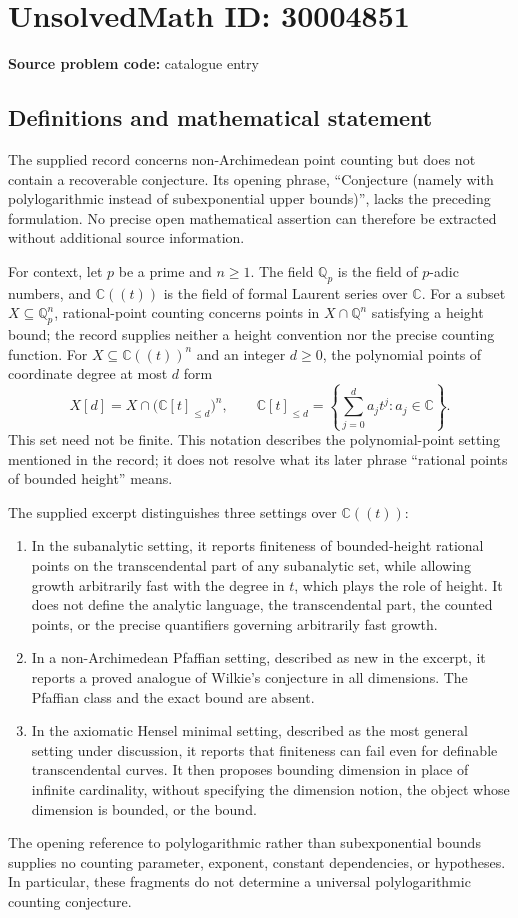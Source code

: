 \documentclass[11pt]{article}
\newcommand{\Q}{\mathbb{Q}}
\newcommand{\C}{\mathbb{C}}
\begin{document}
\section*{UnsolvedMath ID: 30004851}
\textbf{Source problem code:} catalogue entry
\subsection{Definitions and mathematical statement}
The supplied record concerns non-Archimedean point counting but does not contain a recoverable conjecture. Its opening phrase, ``Conjecture (namely with polylogarithmic instead of subexponential upper bounds)'', lacks the preceding formulation. No precise open mathematical assertion can therefore be extracted without additional source information.

For context, let \(p\) be a prime and \(n\geq 1\). The field \(\Q_p\) is the field of \(p\)-adic numbers, and \(\C((t))\) is the field of formal Laurent series over \(\C\). For a subset \(X\subseteq\Q_p^n\), rational-point counting concerns points in \(X\cap\Q^n\) satisfying a height bound; the record supplies neither a height convention nor the precise counting function. For \(X\subseteq\C((t))^n\) and an integer \(d\geq 0\), the polynomial points of coordinate degree at most \(d\) form
\[
X[d]=X\cap\bigl(\C[t]_{\leq d}\bigr)^n,
\qquad
\C[t]_{\leq d}=\left\{\sum_{j=0}^{d}a_jt^j:a_j\in\C\right\}.
\]
This set need not be finite. This notation describes the polynomial-point setting mentioned in the record; it does not resolve what its later phrase ``rational points of bounded height'' means.

The supplied excerpt distinguishes three settings over \(\C((t))\):
\begin{enumerate}
\item In the subanalytic setting, it reports finiteness of bounded-height rational points on the transcendental part of any subanalytic set, while allowing growth arbitrarily fast with the degree in \(t\), which plays the role of height. It does not define the analytic language, the transcendental part, the counted points, or the precise quantifiers governing arbitrarily fast growth.
\item In a non-Archimedean Pfaffian setting, described as new in the excerpt, it reports a proved analogue of Wilkie's conjecture in all dimensions. The Pfaffian class and the exact bound are absent.
\item In the axiomatic Hensel minimal setting, described as the most general setting under discussion, it reports that finiteness can fail even for definable transcendental curves. It then proposes bounding dimension in place of infinite cardinality, without specifying the dimension notion, the object whose dimension is bounded, or the bound.
\end{enumerate}
The opening reference to polylogarithmic rather than subexponential bounds supplies no counting parameter, exponent, constant dependencies, or hypotheses. In particular, these fragments do not determine a universal polylogarithmic counting conjecture.
\end{document}
